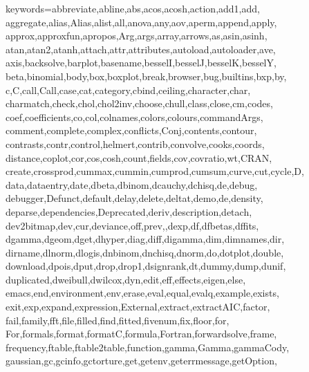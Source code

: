 \def\zz{\ifx\[$\else\aftergroup\zzz\fi}
\def\zzz{\setbox0\lastbox
\dimen0\dimexpr\extrarowheight + \ht0-\dp0\relax
\setbox0\hbox{\raise-.5\dimen0\box0}%
\ht0=\dimexpr\ht0+\extrarowheight\relax
\dp0=\dimexpr\dp0+\extrarowheight\relax
\box0
}


%
\newcommand{\const}{ \mathrm{const}}
\renewcommand{\Re}{ \mathrm{Re}}
\renewcommand{\Im}{ \mathrm{Im}}
\newcommand{\M}{ \mathrm{M} }

%
{keywords={abbreviate,abline,abs,acos,acosh,action,add1,add,%
    aggregate,alias,Alias,alist,all,anova,any,aov,aperm,append,apply,%
    approx,approxfun,apropos,Arg,args,array,arrows,as,asin,asinh,%
    atan,atan2,atanh,attach,attr,attributes,autoload,autoloader,ave,%
    axis,backsolve,barplot,basename,besselI,besselJ,besselK,besselY,%
    beta,binomial,body,box,boxplot,break,browser,bug,builtins,bxp,by,%
    c,C,call,Call,case,cat,category,cbind,ceiling,character,char,%
    charmatch,check,chol,chol2inv,choose,chull,class,close,cm,codes,%
    coef,coefficients,co,col,colnames,colors,colours,commandArgs,%
    comment,complete,complex,conflicts,Conj,contents,contour,%
    contrasts,contr,control,helmert,contrib,convolve,cooks,coords,%
    distance,coplot,cor,cos,cosh,count,fields,cov,covratio,wt,CRAN,%
    create,crossprod,cummax,cummin,cumprod,cumsum,curve,cut,cycle,D,%
    data,dataentry,date,dbeta,dbinom,dcauchy,dchisq,de,debug,%
    debugger,Defunct,default,delay,delete,deltat,demo,de,density,%
    deparse,dependencies,Deprecated,deriv,description,detach,%
    dev2bitmap,dev,cur,deviance,off,prev,,dexp,df,dfbetas,dffits,%
    dgamma,dgeom,dget,dhyper,diag,diff,digamma,dim,dimnames,dir,%
    dirname,dlnorm,dlogis,dnbinom,dnchisq,dnorm,do,dotplot,double,%
    download,dpois,dput,drop,drop1,dsignrank,dt,dummy,dump,dunif,%
    duplicated,dweibull,dwilcox,dyn,edit,eff,effects,eigen,else,%
    emacs,end,environment,env,erase,eval,equal,evalq,example,exists,%
    exit,exp,expand,expression,External,extract,extractAIC,factor,%
    fail,family,fft,file,filled,find,fitted,fivenum,fix,floor,for,%
    For,formals,format,formatC,formula,Fortran,forwardsolve,frame,%
    frequency,ftable,ftable2table,function,gamma,Gamma,gammaCody,%
    gaussian,gc,gcinfo,gctorture,get,getenv,geterrmessage,getOption,%
}}
